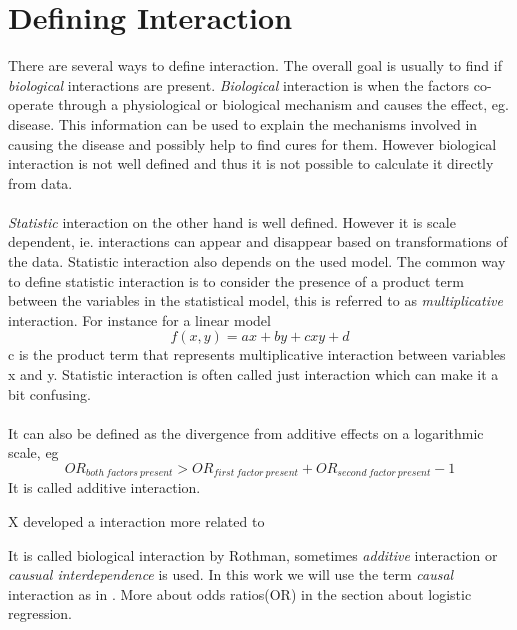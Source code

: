 \documentclass[10pt,a4paper]{report}
\begin{document}
\section{Defining Interaction}
There are several ways to define interaction. The overall goal is usually to find if \emph{biological} interactions are present. \emph{Biological} interaction is when the factors co-operate through a physiological or biological mechanism and causes the effect, eg. disease. This information can be used to explain the mechanisms involved in causing the disease and possibly help to find cures for them. However biological interaction is not well defined and thus it is not possible to calculate it directly from data.\cite{rothman1998modern,rothman2002intro_epidemiology}\\
\\
\emph{Statistic} interaction on the other hand is well defined. However it is scale dependent, ie. interactions can appear and disappear based on transformations of the data. Statistic interaction also depends on the used model. The common way to define statistic interaction is to consider the presence of a product term between the variables in the statistical model, this is referred to as \emph{multiplicative} interaction. For instance for a linear model
\begin{equation}
f(x,y)=ax+by+cxy+d
\end{equation}
c is the product term that represents multiplicative interaction between variables x and y. Statistic interaction is often called just interaction which can make it a bit confusing.\cite{geira,rothman1998modern}\\
\\
It can also be defined as the divergence from additive effects on a logarithmic scale, eg
\begin{equation}
OR_{both\:factors\:present}>OR_{first\:factor\:present}+OR_{second\:factor\:present}-1
\end{equation}
It is called additive interaction.

X developed a interaction more related to 


It is called biological interaction by Rothman\cite{rothman1998modern}, sometimes \emph{additive} interaction\cite{geira} or \emph{causual interdependence}\cite{greenland1988invariants} is used. In this work we will use the term \emph{causal} interaction as in \cite{causal_bounds_arvid}. More about odds ratios(OR) in the section about logistic regression.\\
\end{document}
